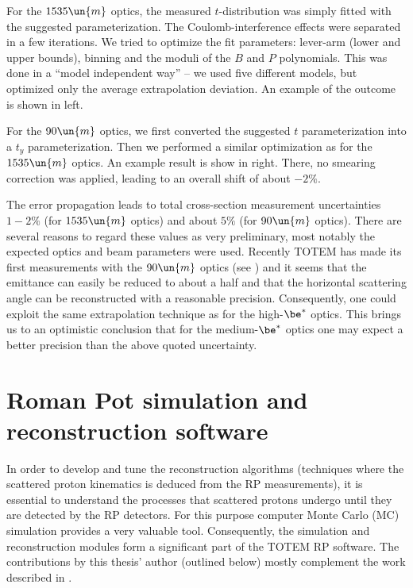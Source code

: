 For the $1535\un{m}$ optics, the measured $t$-distribution was simply fitted with the suggested parameterization. The Coulomb-interference effects were separated in a few iterations. We tried to optimize the fit parameters: lever-arm (lower and upper bounds), binning and the moduli of the $B$ and $P$ polynomials. This was done in a ``model independent way'' -- we used five different models, but optimized only the average extrapolation deviation. An example of the outcome is shown in  left.

For the $90\un{m}$ optics, we first converted the suggested $t$ parameterization into a $t_y$ parameterization. Then we performed a similar optimization as for the $1535\un{m}$ optics. An example result is show in  right. There, no smearing correction was applied, leading to an overall shift of about $-2\%$.


The error propagation leads to total cross-section measurement uncertainties $1-2\%$ (for $1535\un{m}$ optics) and about $5\%$ (for $90\un{m}$ optics). There are several reasons to regard these values as very preliminary, most notably the expected optics and beam parameters were used. Recently TOTEM has made its first measurements with the $90\un{m}$ optics (see ) and it seems that the emittance can easily be reduced to about a half and that the horizontal scattering angle can be reconstructed with a reasonable precision. Consequently, one could exploit the same extrapolation technique as for the high-$\be^*$ optics. This brings us to an optimistic conclusion that for the medium-$\be^*$ optics one may expect a better precision than the above quoted uncertainty.



\chapter[sr]{Roman Pot simulation and reconstruction software}

In order to develop and tune the reconstruction algorithms (techniques where the scattered proton kinematics is deduced from the RP measurements), it is essential to understand the processes that scattered protons undergo until they are detected by the RP detectors. For this purpose computer Monte Carlo (MC) simulation provides a very valuable tool. Consequently, the simulation and reconstruction modules form a significant part of the TOTEM RP software. The contributions by this thesis' author (outlined below) mostly complement the work described in .

